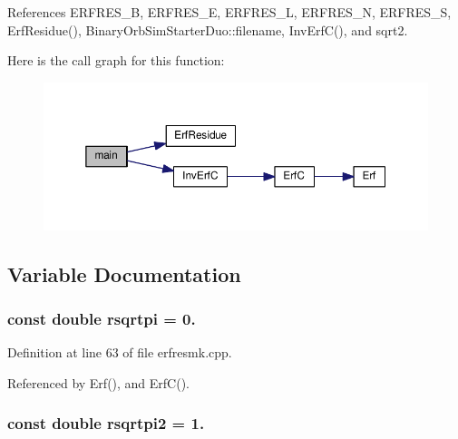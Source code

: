 References E\-R\-F\-R\-E\-S\-\_\-\-B, E\-R\-F\-R\-E\-S\-\_\-\-E, E\-R\-F\-R\-E\-S\-\_\-\-L, E\-R\-F\-R\-E\-S\-\_\-\-N, E\-R\-F\-R\-E\-S\-\_\-\-S, Erf\-Residue(), Binary\-Orb\-Sim\-Starter\-Duo\-::filename, Inv\-Erf\-C(), and sqrt2.



Here is the call graph for this function\-:\nopagebreak
\begin{figure}[H]
\begin{center}
\leavevmode
\includegraphics[width=350pt]{toolboxes_2rnd_2erfresmk_8cpp_ae66f6b31b5ad750f1fe042a706a4e3d4_cgraph}
\end{center}
\end{figure}




\subsection{Variable Documentation}
\subsubsection[{rsqrtpi}]{\setlength{\rightskip}{0pt plus 5cm}const double rsqrtpi = 0.\hspace{0.3cm}{\ttfamily [static]}}\label{toolboxes_2rnd_2erfresmk_8cpp_a5d77540ba72d2896426a602d0608ae08}


Definition at line 63 of file erfresmk.\-cpp.



Referenced by Erf(), and Erf\-C().

\subsubsection[{rsqrtpi2}]{\setlength{\rightskip}{0pt plus 5cm}const double rsqrtpi2 = 1.\hspace{0.3cm}{\ttfamily [static]}}\label{toolboxes_2rnd_2erfresmk_8cpp_ad6ff57468381393a5aa6b6a666ec09bf}



